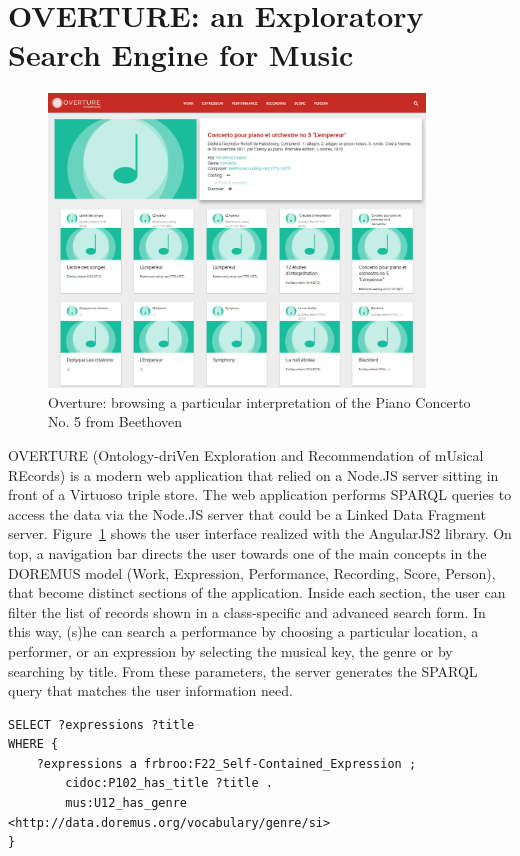 \documentclass[runningheads,a4paper]{llncs}
\begin{document}
\section{OVERTURE: an Exploratory Search Engine for Music}
\label{sec:overture}
\begin{figure}
  \centering
  \includegraphics[width=10cm]{img/overture-detail.png}
  \caption{Overture: browsing a particular interpretation of the Piano Concerto No. 5 from Beethoven}
  \label{fig:overture-detail}
\end{figure}

OVERTURE (Ontology-driVen Exploration and Recommendation of mUsical REcords) is a modern web application that relied on a Node.JS server sitting in front of a Virtuoso triple store. The web application performs SPARQL queries to access the data via the Node.JS server that could be a Linked Data Fragment server. Figure~\ref{fig:overture-detail} shows the user interface realized with the AngularJS2 library. On top, a navigation bar directs the user towards one of the main concepts in the DOREMUS model (Work, Expression, Performance, Recording, Score, Person), that become distinct sections of the application. Inside each section, the user can filter the list of records shown in a class-specific and advanced search form. In this way, (s)he can search a performance by choosing a particular location, a performer, or an expression by selecting the musical key, the genre or by searching by title. From these parameters, the server generates the SPARQL query that matches the user information need.
{\scriptsize
\begin{verbatim}
SELECT ?expressions ?title
WHERE {
    ?expressions a frbroo:F22_Self-Contained_Expression ;
        cidoc:P102_has_title ?title .
        mus:U12_has_genre <http://data.doremus.org/vocabulary/genre/si>
}
\end{verbatim}
}
\end{document}
